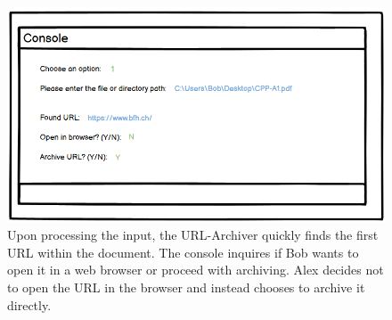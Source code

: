 \begin{figure}[h!]
    \centering
    \includegraphics[width=1\textwidth]{pictures/Story Board/StoryBoard_3}
    \caption{Upon processing the input, the URL-Archiver quickly finds the first URL within the document. The console inquires if Bob wants to open it in a web browser or proceed with archiving. Alex decides not to open the URL in the browser and instead chooses to archive it directly.}
    \label{fig:StoryBoard_3}
\end{figure}
\clearpage

